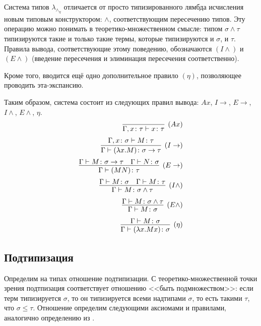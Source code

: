 \documentclass[../main.tex]{subfiles}
\begin{document}
Система типов $\lambda_\wedge_\eta$ отличается от просто типизированного лямбда исчисления новым типовым конструктором: $\wedge$, соответствующим пересечению типов. Эту операцию можно понимать в теоретико-множественном смысле: типом $\sigma \wedge \tau$ типизируются такие и только такие термы, которые типизируются и $\sigma$, и $\tau$. Правила вывода, соответствующие этому поведению, обозначаются $(I\wedge)$ и $(E\wedge)$ (введение пересечения и элиминация пересечения соответственно). 

Кроме того, вводится ещё одно дополнительное правило $(\eta)$, позволяющее проводить эта-экспансию. 

Таким образом, система состоит из следующих правил вывода: $Ax$, $I\to$, $E\to$, $I\wedge$, $E\wedge$, $\eta$.
\begin{equation} \label{rules eta}
\begin{aligned}
\infer[(Ax)]{\Gamma, x \colon \tau \vdash x \colon \tau}{}\\[2pt]
\infer[(I\to)]{\Gamma \vdash (\lambda x . M) \colon \sigma \to \tau}{\Gamma, x \colon \sigma \vdash M \colon \tau}\\[2pt]
\infer[(E\to)]{\Gamma \vdash (MN) \colon \tau}{\Gamma \vdash M \colon \sigma \to \tau & \Gamma \vdash N \colon \sigma}\\[2pt]
\infer[(I\wedge)]{\Gamma \vdash M \colon \sigma \wedge \tau}{\Gamma \vdash M \colon \sigma & \Gamma \vdash M \colon \tau}\\[2pt]
\infer[(E\wedge)]{\Gamma \vdash M \colon \sigma}{\Gamma \vdash M \colon \sigma \wedge \tau}\\[2pt]
\infer[(\eta)]{\Gamma \vdash (\lambda x . M x) \colon \sigma}{\Gamma \vdash M \colon \sigma}

\end{aligned}
\end{equation}

\subsection{Подтипизация}


Определим на типах отношение подтипизации. С теоретико-множественной точки зрения подтпизация соответствует отношению <<быть подмножеством>>: если терм типизируется $\sigma$, то он типизируется всеми надтипами $\sigma$, то есть такими $\tau$, что $\sigma \leqslant \tau$. Отношение определим следующими аксиомами и правилами, аналогично определению из \cite{hindley_82}.
\end{document}
